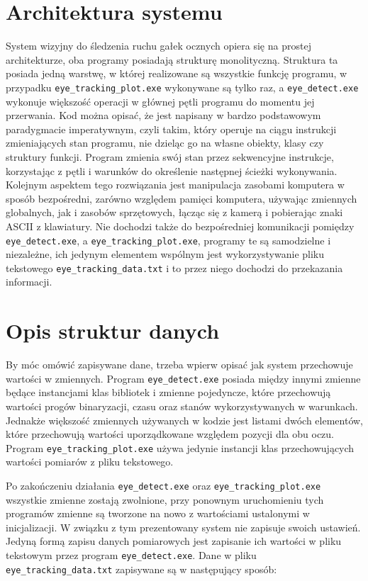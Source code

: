\documentclass[a4paper,twoside,12pt]{book}
\begin{document}
\section{Architektura systemu}
\label{sec:Architektura-systemu}

System wizyjny do śledzenia ruchu gałek ocznych opiera się na prostej architekturze, oba programy posiadają strukturę monolityczną. Struktura ta posiada jedną warstwę, w której realizowane są wszystkie funkcję programu, w przypadku \texttt{eye\_\-tracking\_\-plot.exe} wykonywane są tylko raz, a \texttt{eye\-\_detect.exe} wykonuje większość operacji w głównej pętli programu do momentu jej przerwania. Kod można opisać, że jest napisany w bardzo podstawowym paradygmacie imperatywnym, czyli takim, który operuje na ciągu instrukcji zmieniających stan programu, nie dzieląc go na własne obiekty, klasy czy struktury funkcji. Program zmienia swój stan przez sekwencyjne instrukcje, korzystając z pętli i warunków do określenie następnej ścieżki wykonywania. Kolejnym aspektem tego rozwiązania jest manipulacja zasobami komputera w sposób bezpośredni, zarówno względem pamięci komputera, używając zmiennych globalnych, jak i zasobów sprzętowych, łącząc się z kamerą i pobierając znaki ASCII z klawiatury. Nie dochodzi także do bezpośredniej komunikacji pomiędzy \texttt{eye\-\_detect.exe}, a \texttt{eye\_\-tracking\_\-plot.exe}, programy te są samodzielne i niezależne, ich jedynym elementem wspólnym jest wykorzystywanie pliku tekstowego \texttt{eye\_tracking\_data.txt} i to przez niego dochodzi do przekazania informacji.

\section{Opis struktur danych}
\label{sec:Opis-struktury-danych}

By móc omówić zapisywane dane, trzeba wpierw opisać jak system przechowuje wartości w zmiennych. Program \texttt{eye\-\_detect\-.exe} posiada między innymi zmienne będące instancjami klas bibliotek i zmienne pojedyncze, które przechowują wartości progów binaryzacji, czasu oraz stanów wykorzystywanych w warunkach. Jednakże większość zmiennych używanych w kodzie jest listami dwóch elementów, które przechowują wartości uporządkowane względem pozycji dla obu oczu. Program \texttt{eye\_\-tracking\_\-plot\-.exe} używa jedynie instancji klas przechowujących wartości pomiarów z pliku tekstowego. 

Po zakończeniu działania \texttt{eye\-\_detect\-.exe} oraz \texttt{eye\_\-tracking\_\-plot\-.exe} wszystkie zmienne zostają zwolnione, przy ponownym uruchomieniu tych programów zmienne są tworzone na nowo z wartościami ustalonymi w inicjalizacji. W związku z tym prezentowany system nie zapisuje swoich ustawień. Jedyną formą zapisu danych pomiarowych jest zapisanie ich wartości w pliku tekstowym przez program \texttt{eye\-\_detect.exe}. Dane w pliku \texttt{eye\_tracking\_data.txt} zapisywane są w następujący sposób:
\end{document}
